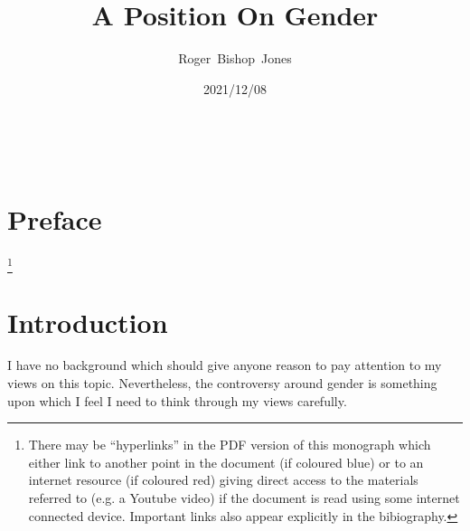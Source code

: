 \documentclass[10pt,titlepage]{article}
\title{\LARGE\bf A Position On Gender}
\author{Roger~Bishop~Jones}
\date{\small 2021/12/08}
\newcommand{\ignore}[1]{}
\begin{document}
                               
\begin{titlepage}
\maketitle





\end{titlepage}

\ \

\ignore{
\begin{centering}
{}
\end{centering}
}%

\setcounter{tocdepth}{2}
{\parskip-0pt\tableofcontents}


\pagebreak

\section*{Preface}


\footnote{There may be ``hyperlinks'' in the PDF version of this monograph which either link to another point in the document  (if coloured blue) or to an internet resource  (if coloured red) giving direct access to the materials referred to (e.g. a Youtube video) if the document is read using some internet connected device.
Important links also appear explicitly in the bibiography.}

\section{Introduction}

I have no background which should give anyone reason to pay attention to my views on this topic.
Nevertheless, the controversy around gender is something upon which I feel I need to think through my views carefully.
\end{document}
